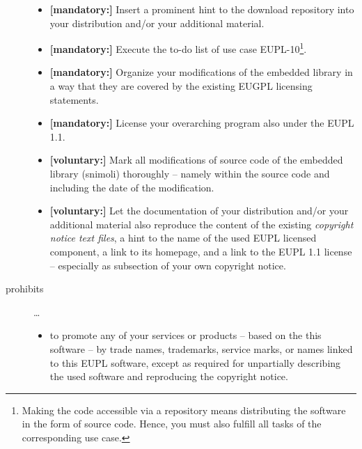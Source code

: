 \begin{description}
\begin{itemize}
  \item \textbf{[mandatory:]} Insert a prominent hint to the download repository
  into your distribution and/or your additional material.
  
  \item \textbf{[mandatory:]} Execute the to-do list of use case EUPL-10\footnote{
  Making the code accessible via a repository means distributing the software in
  the form of source code. Hence, you must also fulfill all tasks of the
  corresponding use case.}.
  
  \item \textbf{[mandatory:]} Organize your modifications of the embedded
  library in a way that they are covered by the existing EUGPL licensing
  statements. 
  
  \item \textbf{[mandatory:]} License your overarching program also under the
  EUPL 1.1.
  
  \item \textbf{[voluntary:]} Mark all modifications of source code of the
  embedded library (snimoli) thoroughly -- namely within the source code and
  including the date of the modification.

  \item \textbf{[voluntary:]} Let the documentation of your distribution and/or
  your additional material  also reproduce the content of the existing
  \emph{copyright notice text files}, a hint to the name of the used EUPL
  licensed component, a link to its homepage, and a link to the EUPL 1.1 license
  -- especially as subsection of your own copyright notice.
  
\end{itemize}

\item[prohibits] \ldots
\begin{itemize}
  \item to promote any of your services or products -- based on the this software
  -- by trade names, trademarks, service marks, or names linked to this EUPL
  software, except as required for unpartially describing the used software and
  reproducing the copyright notice.
\end{itemize}

\end{description}

